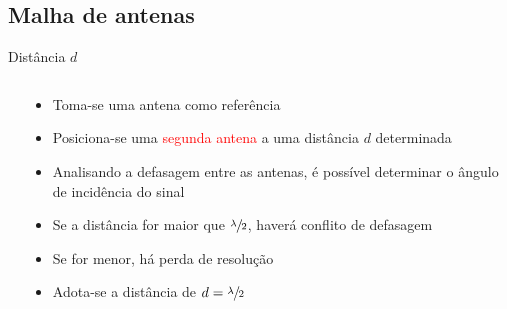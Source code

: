 \subsection{Malha de antenas}
    \begin{frame}{Distância $d$}
                \begin{columns}
            \begin{column}{0.45\textwidth}
                \centering \vfill
                \vfill
                \visible<5->{}\vfill
                \vfill
            \end{column}
            \begin{column}{0.55\textwidth}
                \begin{itemize}[<+(-1)->]\addtolength{\itemsep}{0.5\baselineskip}
                    \item Toma-se uma \textcolor{cmyk_B}{antena} como referência
                    \item Posiciona-se uma \textcolor{Red}{segunda antena} a uma distância $d$ determinada
                    \item Analisando a defasagem entre as antenas, é possível determinar o ângulo de incidência do sinal
                    \item Se a distância for maior que $\sfrac{\lambda}{2}$, haverá conflito de defasagem
                    \item Se for menor, há perda de resolução
                    \item Adota-se a distância de $d = \sfrac{\lambda}{2}$
                \end{itemize}
            \end{column}
        \end{columns}
    \end{frame}

